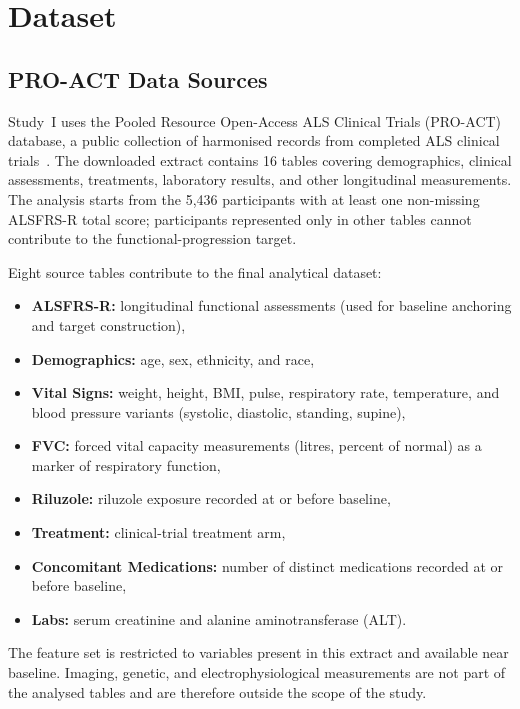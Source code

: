 \clearpage
\section{Dataset}
\label{sec:methods_dataset}
\subsection{PRO-ACT Data Sources}
\label{sec:methods_proact_sources}
Study~I uses the Pooled Resource Open-Access \gls{ALS} Clinical Trials (\gls{PRO-ACT}) database, a public collection of harmonised records from completed ALS clinical trials~\cite{PROACT}. The downloaded extract contains 16 tables covering demographics, clinical assessments, treatments, laboratory results, and other longitudinal measurements. The analysis starts from the 5,436 participants with at least one non-missing \gls{ALSFRS-R} total score; participants represented only in other tables cannot contribute to the functional-progression target.

Eight source tables contribute to the final analytical dataset:
\begin{itemize}
  \item \textbf{\gls{ALSFRS-R}:} longitudinal functional assessments (used for baseline anchoring and target construction),
  \item \textbf{Demographics:} age, sex, ethnicity, and race,
  \item \textbf{Vital Signs:} weight, height, \gls{BMI}, pulse, respiratory rate, temperature, and blood pressure variants (systolic, diastolic, standing, supine),
  \item \textbf{\gls{FVC}:} forced vital capacity measurements (litres, percent of normal) as a marker of respiratory function,
  \item \textbf{Riluzole:} riluzole exposure recorded at or before baseline,
  \item \textbf{Treatment:} clinical-trial treatment arm,
  \item \textbf{Concomitant Medications:} number of distinct medications recorded at or before baseline,
  \item \textbf{Labs:} serum creatinine and alanine aminotransferase (\gls{ALT}).
\end{itemize}
The feature set is restricted to variables present in this extract and available near baseline. Imaging, genetic, and electrophysiological measurements are not part of the analysed tables and are therefore outside the scope of the study.

